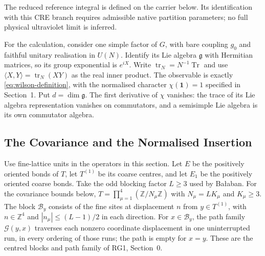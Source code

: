 \documentclass[11pt]{article}
\newcommand{\tr}{\operatorname{tr}}
\newcommand{\id}{\mathbf 1}
\begin{document}
The reduced reference integral is defined on the carrier below. Its identification with this CRE branch requires admissible native partition parameters; no full physical ultraviolet limit is inferred.

For the calculation, consider one simple factor of $G$, with bare coupling $g_0$ and faithful unitary realisation in $U(N)$. Identify its Lie algebra $\mathfrak g$ with Hermitian matrices, so its group exponential is $e^{iX}$. Write $\tr_N=N^{-1}\operatorname{Tr}$ and use $\langle X,Y\rangle=\tr_N(XY)$ as the real inner product. The observable is exactly \eqref{eq:wilson-definition}, with the normalised character $\chi(\id)=1$ specified in Section~1. Put $d=\dim\mathfrak g$. The first derivative of $\chi$ vanishes: the trace of its Lie algebra representation vanishes on commutators, and a semisimple Lie algebra is its own commutator algebra.

\subsection{The Covariance and the Normalised Insertion}

Use fine-lattice units in the operators in this section. Let $E$ be the positively oriented bonds of $T$, let $T^{(1)}$ be its coarse centres, and let $E_1$ be the positively oriented coarse bonds. Take the odd blocking factor $L\geq 3$ used by Ba{\l}aban. For the covariance bounds below, $T=\prod_{\mu=1}^4(\mathbb Z/N_\mu\mathbb Z)$ with $N_\mu=LK_\mu$ and $K_\mu\geq 3$. The block $\mathcal B_y$ consists of the fine sites at displacement $n$ from $y\in T^{(1)}$, with $n\in\mathbb Z^4$ and $|n_\mu|\leq (L-1)/2$ in each direction. For $x\in\mathcal B_y$, the path family $\mathcal G(y,x)$ traverses each nonzero coordinate displacement in one uninterrupted run, in every ordering of those runs; the path is empty for $x=y$. These are the centred blocks and path family of RG1, Section~0.
\end{document}
